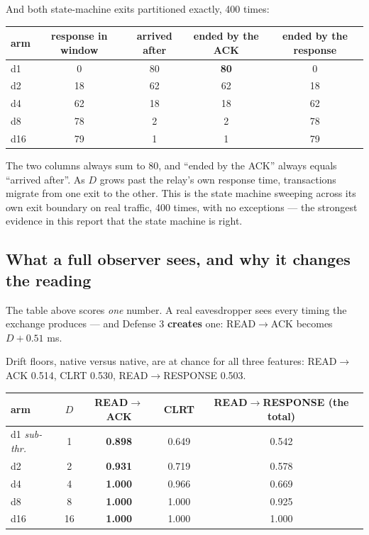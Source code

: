 \documentclass[10pt,a4paper,oneside]{article}
\newcommand{\num}[1]{\mbox{#1}}
\begin{document}
And both state-machine exits partitioned exactly, 400 times:

\begin{center}
\begin{tabular}{lcccc}
\toprule
\textbf{arm} & \textbf{response in window} & \textbf{arrived after}
& \textbf{ended by the ACK} & \textbf{ended by the response} \\
\midrule
d1  & 0  & 80 & \textbf{80} & 0  \\
d2  & 18 & 62 & 62 & 18 \\
d4  & 62 & 18 & 18 & 62 \\
d8  & 78 & 2  & 2  & 78 \\
d16 & 79 & 1  & 1  & 79 \\
\bottomrule
\end{tabular}
\end{center}

The two columns always sum to 80, and ``ended by the ACK'' always equals ``arrived after''.
As $D$ grows past the relay's own response time, transactions migrate from one exit to the
other. This is the state machine sweeping across its own exit boundary on real traffic,
400 times, with no exceptions --- the strongest evidence in this report that the state
machine is right.

\subsection{What a full observer sees, and why it changes the reading}

The table above scores \emph{one} number. A real eavesdropper sees every timing the exchange
produces --- and Defense 3 \textbf{creates} one: READ$\to$ACK becomes $D+\num{0.51}$ ms.

Drift floors, native versus native, are at chance for all three features: READ$\to$ACK
\num{0.514}, CLRT \num{0.530}, READ$\to$RESPONSE \num{0.503}.

\begin{center}
\begin{tabular}{lcccc}
\toprule
\textbf{arm} & \textbf{$D$} & \textbf{READ$\to$ACK} & \textbf{CLRT}
& \textbf{READ$\to$RESPONSE (the total)} \\
\midrule
d1 \emph{sub-thr.} & 1  & \textbf{\num{0.898}} & \num{0.649} & \num{0.542} \\
d2             & 2  & \textbf{\num{0.931}} & \num{0.719} & \num{0.578} \\
d4             & 4  & \textbf{\num{1.000}} & \num{0.966} & \num{0.669} \\
d8             & 8  & \textbf{\num{1.000}} & \num{1.000} & \num{0.925} \\
d16            & 16 & \textbf{\num{1.000}} & \num{1.000} & \num{1.000} \\
\bottomrule
\end{tabular}
\end{center}
\end{document}

